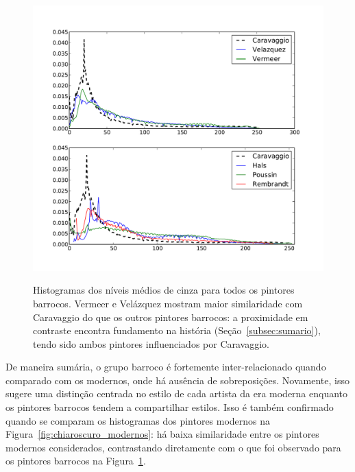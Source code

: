 \begin{figure}[h!]
    
\begin{center}
{    \centering
        \includegraphics[width=\columnwidth]{figs/chiaroscuro}}
      \caption{Histogramas dos níveis médios de cinza para todos os
        pintores barrocos. Vermeer e Velázquez mostram maior
        similaridade com Caravaggio do que os outros pintores
        barrocos: a proximidade em contraste encontra fundamento na
        história (Seção~\ref{subsec:sumario}), tendo sido ambos
        pintores influenciados por Caravaggio.}
        \label{fig:chiaroscuro}
  \end{center}
\end{figure}

De maneira sumária, o grupo barroco é fortemente inter-relacionado
quando comparado com os modernos, onde há ausência de
sobreposições. Novamente, isso sugere uma distinção centrada no estilo
de cada artista da era moderna enquanto os pintores barrocos tendem a
compartilhar estilos. Isso é também confirmado quando se comparam os
histogramas dos pintores modernos na
Figura~\ref{fig:chiaroscuro_modernos}: há baixa similaridade entre os
pintores modernos considerados, contrastando diretamente com o que foi
observado para os pintores barrocos na Figura~\ref{fig:chiaroscuro}.

